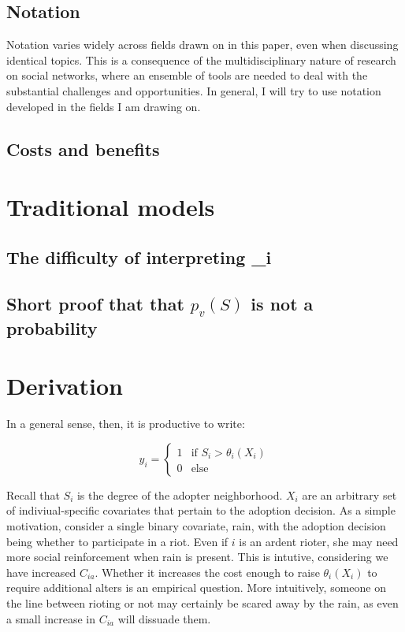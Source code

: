 \documentclass{article}
\begin{document}
\subsection{Notation}

Notation varies widely across fields drawn on in this paper, even when discussing identical topics. This is a consequence of the multidisciplinary nature of research on social networks, where an ensemble of tools are needed to deal with the substantial challenges and opportunities. In general, I will try to use notation developed in the fields I am drawing on. 



\subsection{Costs and benefits}

\section{Traditional models}

\subsection{The difficulty of interpreting \theta_i}

\subsection{Short proof that that $p_v(S)$ is not a probability}

\section{Derivation}

In a general sense, then, it is productive to write:

\[
y_i =
    \begin{cases}
       1 & \text{if } S_i > \theta_i(X_i) \\
       0 & \text{else}
      \end{cases}
\]

Recall that $S_i$ is the degree of the adopter neighborhood. $X_i$ are an arbitrary set of indiviual-specific covariates that pertain to the adoption decision. As a simple motivation, consider a single binary covariate, rain, with the adoption decision being whether to participate in a riot. Even if $i$ is an ardent rioter, she may need more social reinforcement when rain is present. This is intutive, considering we have increased $C_{ia}$. Whether it increases the cost enough to raise $\theta_i(X_i)$ to require additional alters is an empirical question. More intuitively, someone on the line between rioting or not may certainly be scared away by the rain, as even a small increase in $C_{ia}$ will dissuade them.
\end{document}
